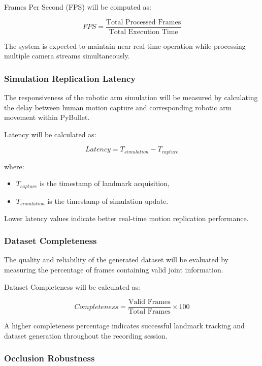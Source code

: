 Frames Per Second (FPS) will be computed as:

\begin{equation}
FPS = \frac{\text{Total Processed Frames}}{\text{Total Execution Time}}
\end{equation}

The system is expected to maintain near real-time operation while processing multiple camera streams simultaneously.

\subsubsection{Simulation Replication Latency}

The responsiveness of the robotic arm simulation will be measured by calculating the delay between human motion capture and corresponding robotic arm movement within PyBullet.

Latency will be calculated as:

\begin{equation}
Latency = T_{simulation} - T_{capture}
\end{equation}

where:
\begin{itemize}
    \item $T_{capture}$ is the timestamp of landmark acquisition,
    \item $T_{simulation}$ is the timestamp of simulation update.
\end{itemize}

Lower latency values indicate better real-time motion replication performance.

\subsubsection{Dataset Completeness}

The quality and reliability of the generated dataset will be evaluated by measuring the percentage of frames containing valid joint information.

Dataset Completeness will be calculated as:

\begin{equation}
Completeness = \frac{\text{Valid Frames}}{\text{Total Frames}} \times 100
\end{equation}

A higher completeness percentage indicates successful landmark tracking and dataset generation throughout the recording session.

\subsubsection{Occlusion Robustness}

